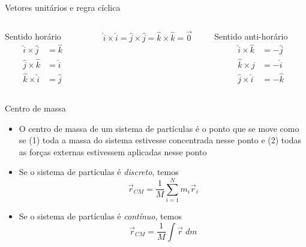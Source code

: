 \documentclass[t,%
brazilian,%
11pt,%
aspectratio=169,%
table%
]{beamer}
\begin{document}
\begin{frame}[c]{Vetores unitários e regra cíclica}
    \begin{columns}[T]
        \begin{column}{0.3\textwidth}
            \centering
            Sentido horário
            \begin{align*}
                \hat{i} \times \hat{j} & = \hat{k} \\
                \hat{j} \times \hat{k} & = \hat{i} \\
                \hat{k} \times \hat{i} & = \hat{j}
            \end{align*}
        \end{column}

        \begin{column}{0.3\textwidth}
            \centering

            \[
                \hat{i} \times \hat{i}  = \hat{j} \times \hat{j} = \hat{k} \times \hat{k} = \vec{0}
            \]

        \end{column}

        \begin{column}{0.3\textwidth}
            \centering
            Sentido anti-horário
            \begin{align*}
                \hat{i} \times \hat{k} & = -\hat{j} \\
                \hat{k} \times \hat{j} & = -\hat{i} \\
                \hat{j} \times \hat{i} & = -\hat{k}
            \end{align*}
        \end{column}
    \end{columns}
\end{frame}

\begin{frame}{Centro de massa}
    \begin{itemize}
        \item O centro de massa de um sistema de partículas é o ponto que se move como se (1) toda a massa do sistema estivesse
            concentrada nesse ponto e (2) todas as forças externas estivessem aplicadas nesse ponto
        \item Se o sistema de partículas é \textit{discreto}, temos
            \[
                \vec{r}_{CM} = \frac{1}{M} \sum_{i=1}^{N} m_i \vec{r}_i
            \]
        \item Se o sistema de partículas é \textit{contínuo}, temos
            \[
                \vec{r}_{CM} = \frac{1}{M} \int \vec{r}\; dm
            \]
    \end{itemize}
\end{frame}
\end{document}
